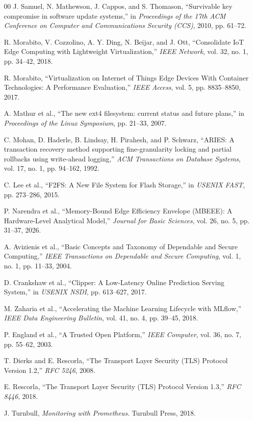 \documentclass[conference]{IEEEtran}
\begin{document}
\begin{thebibliography}{00}
 J. Samuel, N. Mathewson, J. Cappos, and S. Thomason, ``Survivable key compromise in software update systems,'' in \textit{Proceedings of the 17th ACM Conference on Computer and Communications Security (CCS)}, 2010, pp. 61--72.

 R. Morabito, V. Cozzolino, A. Y. Ding, N. Beijar, and J. Ott, ``Consolidate IoT Edge Computing with Lightweight Virtualization,'' \textit{IEEE Network}, vol. 32, no. 1, pp. 34--42, 2018.

 R. Morabito, ``Virtualization on Internet of Things Edge Devices With Container Technologies: A Performance Evaluation,'' \textit{IEEE Access}, vol. 5, pp. 8835--8850, 2017.

 A. Mathur et al., ``The new ext4 filesystem: current status and future plans,'' in \textit{Proceedings of the Linux Symposium}, pp. 21--33, 2007.

 C. Mohan, D. Haderle, B. Lindsay, H. Pirahesh, and P. Schwarz, ``ARIES: A transaction recovery method supporting fine-granularity locking and partial rollbacks using write-ahead logging,'' \textit{ACM Transactions on Database Systems}, vol. 17, no. 1, pp. 94--162, 1992.

 C. Lee et al., ``F2FS: A New File System for Flash Storage,'' in \textit{USENIX FAST}, pp. 273--286, 2015.

 P. Narendra et al., ``Memory-Bound Edge Efficiency Envelope (MBEEE): A Hardware-Level Analytical Model,'' \textit{Journal for Basic Sciences}, vol. 26, no. 5, pp. 31--37, 2026.

 A. Avizienis et al., ``Basic Concepts and Taxonomy of Dependable and Secure Computing,'' \textit{IEEE Transactions on Dependable and Secure Computing}, vol. 1, no. 1, pp. 11--33, 2004.

 D. Crankshaw et al., ``Clipper: A Low-Latency Online Prediction Serving System,'' in \textit{USENIX NSDI}, pp. 613--627, 2017.

 M. Zaharia et al., ``Accelerating the Machine Learning Lifecycle with MLflow,'' \textit{IEEE Data Engineering Bulletin}, vol. 41, no. 4, pp. 39--45, 2018.

 P. England et al., ``A Trusted Open Platform,'' \textit{IEEE Computer}, vol. 36, no. 7, pp. 55--62, 2003.

 T. Dierks and E. Rescorla, ``The Transport Layer Security (TLS) Protocol Version 1.2,'' \textit{RFC 5246}, 2008.

 E. Rescorla, ``The Transport Layer Security (TLS) Protocol Version 1.3,'' \textit{RFC 8446}, 2018.

 J. Turnbull, \textit{Monitoring with Prometheus}. Turnbull Press, 2018.

\end{thebibliography}
\end{document}
